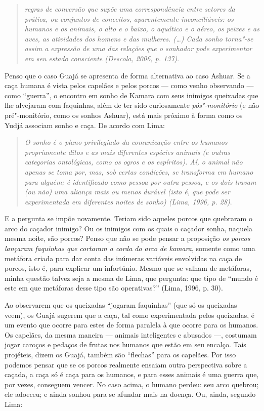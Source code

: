 \begin{quote}
\emph{regras de conversão que supõe uma correspondência entre setores da
prática, ou conjuntos de conceitos, aparentemente inconciliáveis: os
humanos e os animais, o alto e o baixo, o aquático e o aéreo, os peixes
e as aves, as atividades dos homens e das mulheres. (\ldots{}) Cada sonho
torna"-se assim a expressão de uma das relações que o sonhador pode
experimentar em seu estado consciente (Descola, 2006, p. 137)}.
\end{quote}

Penso que o caso Guajá se apresenta de forma alternativa ao caso Ashuar.
Se a caça humana é vista pelos capelães e pelos porcos --- como venho
observando --- como ``guerra'', o encontro em sonho de Kamara com seus
inimigos queixadas que lhe alvejaram com faquinhas, além de ter sido
curiosamente \emph{pós"-monitório} (e não pré"-monitório, como os sonhos
Ashuar), está mais próximo à forma como os Yudjá associam sonho e caça.
De acordo com Lima:

\begin{quote}
\emph{O sonho é o plano privilegiado da comunicação entre os humanos
propriamente ditos e as mais diferentes espécies animais (e outras
categorias ontológicas, como os ogros e os espíritos). Aí, o animal não
apenas se toma por, mas, sob certas condições, se transforma em humano
para alguém; é identificado como pessoa por outra pessoa, e os dois
travam (ou não) uma aliança mais ou menos durável (isto é, que pode ser
experimentada em diferentes noites de sonho) (Lima, 1996, p. 28)}.
\end{quote}

E a pergunta se impõe novamente. Teriam sido aqueles porcos que
quebraram o arco do caçador inimigo? Ou os inimigos com os quais o
caçador sonha, naquela mesma noite, são porcos? Penso que não se pode
pensar a proposição \emph{os porcos lançaram faquinhas que cortaram a
corda do arco de kamara}, somente como uma metáfora criada para dar
conta das inúmeras variáveis envolvidas na caça de porcos, isto é, para
explicar um infortúnio. Mesmo que se valham de metáforas, minha questão
talvez seja a mesma de Lima, que pergunta: que tipo de ``mundo é este em
que metáforas desse tipo são operativas?'' (Lima, 1996, p. 30).

Ao observarem que os queixadas ``jogaram faquinhas'' (que só os queixadas
veem), os Guajá sugerem que a caça, tal como experimentada pelos
queixadas, é um evento que ocorre para estes de forma paralela à que
ocorre para os humanos. Os capelães, da mesma maneira --- animais
inteligentes e abusados ---, costumam jogar caroços e pedaços de frutas
nos humanos que estão em seu encalço. Tais projéteis, dizem os Guajá,
também são ``flechas'' para os capelães. Por isso podemos pensar que se os
porcos realmente ensaiam outra perspectiva sobre a caçada, a caça só é
caça para os humanos, e para esses animais é uma guerra que, por vezes,
conseguem vencer. No caso acima, o humano perdeu: seu arco quebrou; ele
adoeceu; e ainda sonhou para se afundar mais na doença. Ou, ainda,
segundo Lima:


